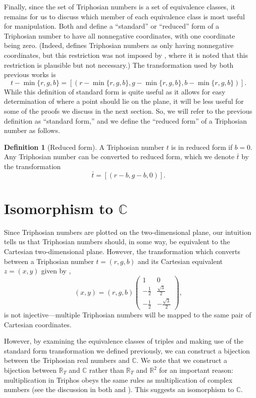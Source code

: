 \documentclass{article}
\theoremstyle{plain}
\theoremstyle{definition}
\newtheorem*{definition}{Definition}
\newcommand{\Tri}{\mathbb{R}_T}
\begin{document}
	Finally, since the set of Triphosian numbers is a set of equivalence
	classes, it remains for us to discuss which member of each equivalence
	class is most useful for manipulation. Both \cite{egging} and
	\cite{grossnickle} define a ``standard'' or ``reduced'' form of a
	Triphosian number to have all nonnegative coordinates, with one coordinate
	being zero. (Indeed, \cite{grossnickle} defines Triphosian numbers as only
	having nonnegative coordinates, but this restriction was not imposed by
	\cite{egging}, where it is noted that this restriction is plausible but not
	necessary.) The transformation used by both previous works is
	\[t - \min\{r, g, b\} = [(r - \min\{r, g, b\}, g - \min\{r, g,
	b\}, b - \min\{r, g, b\})].\]
	While this definition of standard form is quite useful as it allows for
	easy determination of where a point should lie on the plane, it will be
	less useful for some of the proofs we discuss in the next section. So, we
	will refer to the previous definition as ``standard form,'' and we define
	the ``reduced form'' of a Triphosian number as follows.
	\begin{definition}[Reduced form]
		A Triphosian number $t$ is in reduced form if $b = 0$. Any Triphosian
		number can be converted to reduced form, which we denote $\bar{t}$ by
		the transformation
		\[\bar{t} = [(r - b, g - b, 0)].\]
	\end{definition}


	\section{Isomorphism to \(\mathbb{C}\)}

	Since Triphosian numbers are plotted on the two-dimensional plane, our
	intuition tells us that Triphosian numbers should, in some way, be
	equivalent to the Cartesian two-dimensional plane. However, the
	transformation
	which converts between a Triphosian number \(t = (r, g, b)\) and its
	Cartesian equivalent \(z = (x, y)\) given by \cite{egging},
	\[ (x, y) = (r, g, b) \begin{pmatrix} 1 & 0 \\ -\frac{1}{2} &
	\frac{\sqrt{3}}{2} \\ -\frac{1}{2} & -\frac{\sqrt{3}}{2} \end{pmatrix}, \]
	is not injective---multiple Triphosian numbers will be mapped to the
	same pair of Cartesian coordinates.

	However, by examining the equivalence classes of triples and making use of
	the standard form transformation we defined previously, we can construct a
	bijection between the Triphosian real numbers and $\mathbb{C}$. We note
	that we construct a bijection between $\Tri$ and $\mathbb{C}$ rather than
	$\Tri$ and $\mathbb{R}^2$ for an important reason: multiplication in
	Triphos obeys the same rules as multiplication of complex numbers (see the
	discussion in both \cite{egging} and \cite{grossnickle}). This suggests an
	isomorphism to $\mathbb{C}$.
\end{document}
